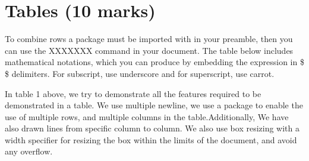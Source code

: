 \documentclass[a4paper,12pt]{article}
\begin{document}
\section{\textbf{Tables (10 marks)}}
%
\noindent To combine rows a package must be imported with in your preamble, then you can use the XXXXXXX command in your document. The table below includes mathematical notations, which you can produce by embedding the expression in \$ \$ delimiters. For subscript, use underscore and for superscript, use carrot.
\newline
\begin{table}[H]
\centering
{}
\captionsetup{width = 0.9\textwidth, font=normalsize}
\caption{Table depicting the use of both multirow and multicolumn}
\end{table}
{\Large In table 1 above, we try to demonstrate all the features required to be demonstrated in a table.  We use multiple newline, we use a package to enable the use of multiple rows,  and multiple columns in the table.Additionally,  We have also drawn lines from specific column to column.   We also use box resizing with a width specifier for resizing the box within the limits of the document, and avoid any overflow.}
\pagebreak
\end{document}
